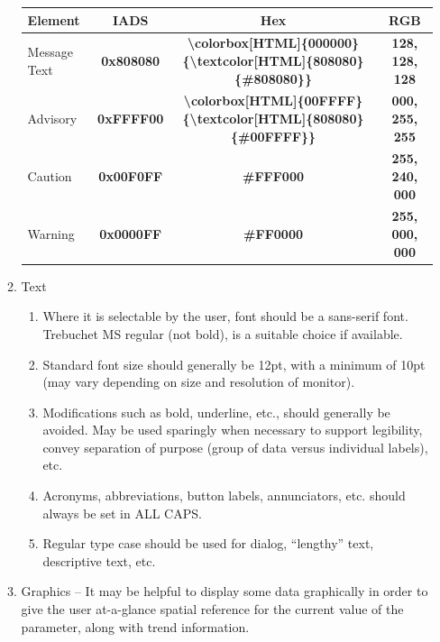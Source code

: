 \documentclass[
]{book}
\providecommand{\tightlist}{%
  \setlength{\itemsep}{0pt}\setlength{\parskip}{0pt}}
\begin{document}
\begin{enumerate}
\begin{enumerate}
    \begin{longtable}[]{@{}lccc@{}}
    \toprule
    Element & IADS & Hex & RGB\tabularnewline
    \midrule
    \endhead
    Message Text & \textbf{\colorbox[HTML]{000000}{\textcolor[HTML]{808080}{0x808080}}} & \textbf{\textbackslash colorbox{[}HTML{]}\{000000\}\{\textbackslash textcolor{[}HTML{]}\{808080\}\{\#808080\}\}} & \textbf{\colorbox[HTML]{000000}{\textcolor[HTML]{808080}{128, 128, 128}}}\tabularnewline
    Advisory & \textbf{\colorbox[HTML]{00FFFF}{\textcolor[HTML]{808080}{0xFFFF00}}} & \textbf{\textbackslash colorbox{[}HTML{]}\{00FFFF\}\{\textbackslash textcolor{[}HTML{]}\{808080\}\{\#00FFFF\}\}} & \textbf{\colorbox[HTML]{00FFFF}{\textcolor[HTML]{808080}{000, 255, 255}}}\tabularnewline
    Caution & \textbf{\colorbox[HTML]{FFF000}{\textcolor[HTML]{808080}{0x00F0FF}}} & \textbf{\colorbox[HTML]{FFF000}{\textcolor[HTML]{808080}{#FFF000}}} & \textbf{\colorbox[HTML]{FFF000}{\textcolor[HTML]{808080}{255, 240, 000}}}\tabularnewline
    Warning & \textbf{\colorbox[HTML]{FF0000}{\textcolor[HTML]{808080}{0x0000FF}}} & \textbf{\colorbox[HTML]{FF0000}{\textcolor[HTML]{808080}{#FF0000}}} & \textbf{\colorbox[HTML]{FF0000}{\textcolor[HTML]{808080}{255, 000, 000}}}\tabularnewline
    \bottomrule
    \end{longtable}
  \item
    Text

    \begin{enumerate}
    \def\labelenumiii{\arabic{enumiii}.}
    \tightlist
    \item
      Where it is selectable by the user, font should be a sans-serif font. Trebuchet MS regular (not bold), is a suitable choice if available.
    \item
      Standard font size should generally be 12pt, with a minimum of 10pt (may vary depending on size and resolution of monitor).
    \item
      Modifications such as bold, underline, etc., should generally be avoided. May be used sparingly when necessary to support legibility, convey separation of purpose (group of data versus individual labels), etc.
    \item
      Acronyms, abbreviations, button labels, annunciators, etc. should always be set in ALL CAPS.
    \item
      Regular type case should be used for dialog, ``lengthy'' text, descriptive text, etc.
    \end{enumerate}
  \item
    Graphics -- It may be helpful to display some data graphically in order to give the user at-a-glance spatial reference for the current value of the parameter, along with trend information.


\end{enumerate}
\end{enumerate}
\end{document}
